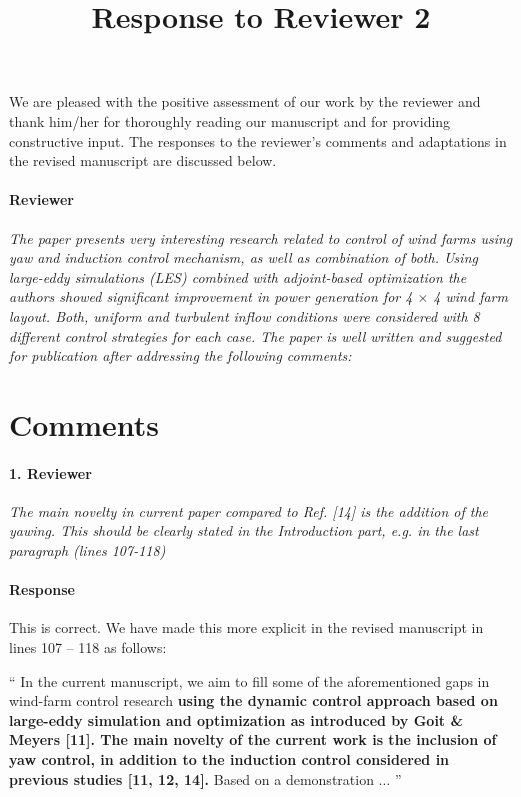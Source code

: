 \documentclass[]{article}
\title{Response to Reviewer 2}
\author{}
\date{}
\begin{document}
\maketitle

We are pleased with the positive assessment of our work by the reviewer and thank him/her for thoroughly reading our manuscript and for providing constructive input. The responses to the reviewer's comments and adaptations in the revised manuscript are discussed below.

\hrulefill

\paragraph{Reviewer} \textit{The paper presents very interesting research related to control of wind farms using yaw and induction control mechanism, as well as combination of both. Using large-eddy simulations (LES) combined with adjoint-based optimization the authors showed significant improvement in power generation for 4 $\times$ 4 wind farm layout. Both, uniform and turbulent inflow conditions were considered with 8 different control strategies for each case. The paper is well written and suggested for publication after addressing the following comments:}


\section*{Comments}
\hrulefill

\paragraph{1. Reviewer} \textit{The main novelty in current paper compared to Ref. [14] is the addition of the yawing. This should be clearly stated in the Introduction part, e.g. in the last paragraph (lines 107-118)}

\paragraph{Response} This is correct. We have made this more explicit in the revised manuscript in lines 107 -- 118 as follows: 

``
In the current manuscript, we aim to fill some of the aforementioned gaps in wind-farm control research \textbf{using the dynamic control approach based on large-eddy simulation and optimization as introduced by Goit \& Meyers [11]. The main novelty of the current work is the inclusion of yaw control, in addition to the induction control considered in previous studies [11, 12, 14].} Based on a demonstration $\dots$
''
\end{document}
